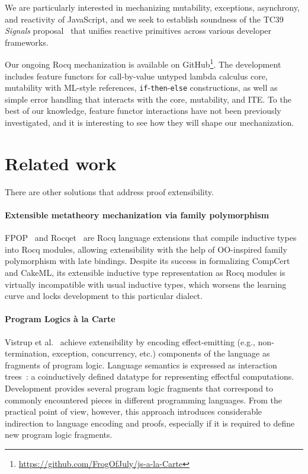 \documentclass[sigplan,nonacm,review]{acmart}
\begin{document}
We are particularly interested in mechanizing
mutability, exceptions, asynchrony, and reactivity of JavaScript, and we seek to establish soundness of the TC39 \emph{Signals} proposal~\cite{signals-proposal-t39} that unifies reactive primitives across various developer frameworks. 



Our ongoing Rocq mechanization is available on
GitHub\footnote{\url{https://github.com/FrogOfJuly/js-a-la-Carte}}. 
The development includes feature functors for call-by-value untyped lambda calculus core, mutability with ML-style references, \texttt{if}-\texttt{then}-\texttt{else} constructions, as well as simple error handling that interacts with the core, mutability, and ITE. To the best of our knowledge, feature functor interactions have not been previously investigated, and it is interesting to see how they will shape our mechanization.

\section{Related work}

There are other solutions that address proof extensibility. 


\paragraph{Extensible metatheory mechanization via family polymorphism} FPOP~\cite{jin2023extensible} and Rocqet~\cite{ebresafe2025certified} are Rocq language extensions that compile inductive types into Rocq modules, allowing extensibility with the help of OO-inspired family polymorphism with late bindings. 
%
%
%
%
Despite its success in formalizing CompCert and CakeML, its extensible inductive type representation as Rocq modules is virtually incompatible with usual inductive types, which worsens the learning curve and locks development to this particular dialect. 

\paragraph{Program Logics à la Carte}
Vistrup et al.~\cite{vistrup2025program} achieve extensibility by encoding effect-emitting
(e.g., non-termination, exception, concurrency, etc.)
components of the language as fragments of program logic. 
Language semantics is expressed as interaction trees~\cite{xia2019interaction}: a coinductively defined datatype for representing effectful computations. 
Development provides several program logic fragments that correspond to commonly encountered pieces in different programming languages. 
%
%
%
%
From the practical point of view, however, this approach introduces considerable indirection to language encoding and proofs, especially if it is required to define new program logic fragments.
\end{document}
